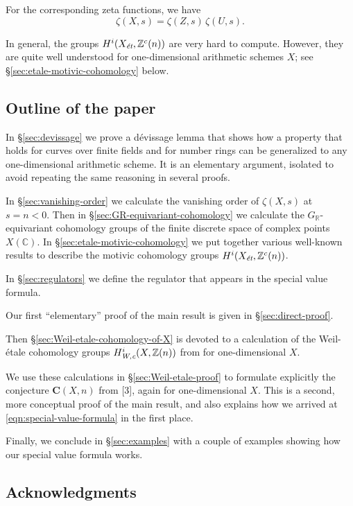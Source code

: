 \documentclass[draft]{article}
\newcommand{\CC}{\mathbb{C}}
\newcommand{\RR}{\mathbb{R}}
\newcommand{\ZZ}{\mathbb{Z}}
\newcommand{\et}{\text{\it \'{e}t}}
\newcommand{\Wc}{\text{\it W,c}}
\theoremstyle{myplain}
\theoremstyle{mydefinition}
\numberwithin{equation}{section}
\begin{document}
For the corresponding zeta functions, we have
$$\zeta (X,s) = \zeta (Z,s)\,\zeta (U,s).$$

In general, the groups $H^i (X_\et, \ZZ^c (n))$ are very hard to
compute. However, they are quite well understood for one-dimensional arithmetic
schemes $X$; see \S\ref{sec:etale-motivic-cohomology} below.

\subsection*{Outline of the paper}

In \S\ref{sec:devissage} we prove a d\'{e}vissage lemma that shows how a
property that holds for curves over finite fields and for number rings can be
generalized to any one-dimensional arithmetic scheme. It is an elementary
argument, isolated to avoid repeating the same reasoning in several proofs.

In \S\ref{sec:vanishing-order} we calculate the vanishing order of $\zeta (X,s)$
at $s = n < 0$. Then in \S\ref{sec:GR-equivariant-cohomology} we calculate the
$G_\RR$-equivariant cohomology groups of the finite discrete space of complex
points $X(\CC)$. In \S\ref{sec:etale-motivic-cohomology} we put together various
well-known results to describe the motivic cohomology groups
$H^i (X_\et, \ZZ^c(n))$.

In \S\ref{sec:regulators} we define the regulator that appears in the special
value formula.

Our first ``elementary'' proof of the main result is given in
\S\ref{sec:direct-proof}.

Then \S\ref{sec:Weil-etale-cohomology-of-X} is devoted to a calculation of the
Weil-\'{e}tale cohomology groups $H^i_\Wc (X, \ZZ(n))$ from
\cite{Beshenov-Weil-etale-1} for one-dimensional $X$.

We use these calculations in \S\ref{sec:Weil-etale-proof} to formulate
explicitly the conjecture $\mathbf{C} (X,n)$ from [3], again for one-dimensional
$X$. This is a second, more conceptual proof of the main result, and also
explains how we arrived at \eqref{eqn:special-value-formula} in the first place.

Finally, we conclude in \S\ref{sec:examples} with a couple of examples showing
how our special value formula works.

\subsection*{Acknowledgments}
\end{document}
